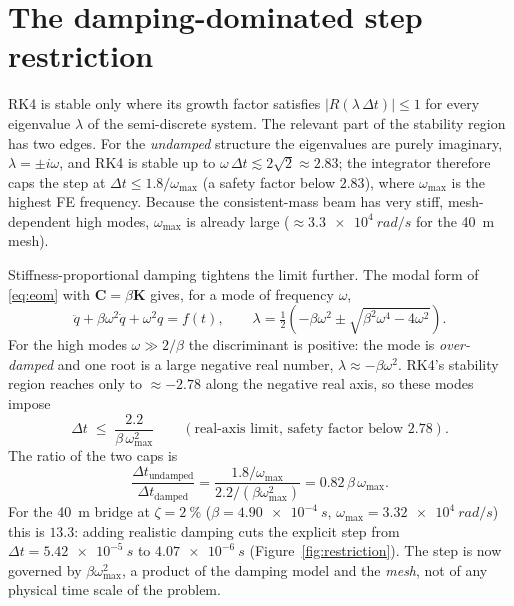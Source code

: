 \documentclass[11pt,a4paper]{article}
\newcommand{\wmax}{\omega_{\max}}
\begin{document}
\section{The damping-dominated step restriction}
RK4 is stable only where its growth factor satisfies \(|R(\lambda\,\Delta t)|\le1\)
for every eigenvalue \(\lambda\) of the semi-discrete system. The relevant part
of the stability region has two edges. For the \emph{undamped} structure the
eigenvalues are purely imaginary, \(\lambda=\pm i\omega\), and RK4 is stable up to
\(\omega\,\Delta t \lesssim 2\sqrt2\approx2.83\); the integrator therefore caps
the step at \(\Delta t \le 1.8/\wmax\) (a safety factor below \(2.83\)), where
\(\wmax\) is the highest FE frequency. Because the consistent-mass beam has very
stiff, mesh-dependent high modes, \(\wmax\) is already large
(\(\approx\SI{3.3e4}{rad/s}\) for the \SI{40}{m} mesh).

Stiffness-proportional damping tightens the limit further.
The modal form of \eqref{eq:eom} with \(\mathbf C=\beta\mathbf K\) gives, for a
mode of frequency \(\omega\),
\begin{equation}
  \ddot q + \beta\omega^{2}\dot q + \omega^{2} q = f(t),
  \qquad
  \lambda = \tfrac12\!\left(-\beta\omega^{2}\pm\sqrt{\beta^{2}\omega^{4}-4\omega^{2}}\right).
\end{equation}
For the high modes \(\omega\gg 2/\beta\) the discriminant is positive: the mode is
\emph{over-damped} and one root is a large negative real number,
\(\lambda \approx -\beta\omega^{2}\). RK4's stability region reaches only to
\(\approx-2.78\) along the negative real axis, so these modes impose
\begin{equation}
  \Delta t \;\le\; \frac{2.2}{\beta\,\wmax^{2}}
  \qquad(\text{real-axis limit, safety factor below }2.78).
  \label{eq:damped-cap}
\end{equation}
The ratio of the two caps is
\begin{equation}
  \frac{\Delta t_{\text{undamped}}}{\Delta t_{\text{damped}}}
  = \frac{1.8/\wmax}{2.2/(\beta\wmax^{2})}
  = 0.82\,\beta\,\wmax .
  \label{eq:ratio}
\end{equation}
For the \SI{40}{m} bridge at \(\zeta=\SI{2}{\percent}\)
(\(\beta=\SI{4.90e-4}{s}\), \(\wmax=\SI{3.32e4}{rad/s}\)) this is
\(\mathbf{13.3}\): adding realistic damping cuts the explicit step from
\(\Delta t=\SI{5.42e-5}{s}\) to \(\SI{4.07e-6}{s}\)
(Figure~\ref{fig:restriction}). The step is now governed by
\(\beta\wmax^{2}\), a product of the damping model and the \emph{mesh}, not of
any physical time scale of the problem.
\end{document}
